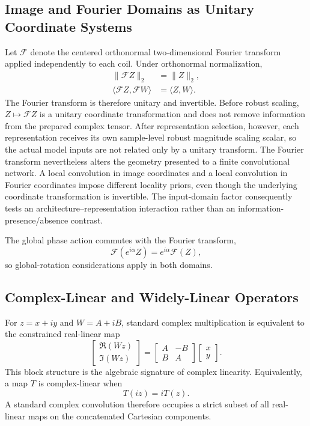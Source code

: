 \subsection{Image and Fourier Domains as Unitary Coordinate Systems}
Let $\mathcal{F}$ denote the centered orthonormal two-dimensional Fourier transform applied independently to each coil. Under orthonormal normalization,
\begin{align}
\|\mathcal{F}Z\|_2 &= \|Z\|_2,\\
\langle \mathcal{F}Z,\mathcal{F}W\rangle &= \langle Z,W\rangle.
\label{eq:parseval}
\end{align}
The Fourier transform is therefore unitary and invertible. Before robust scaling, $Z\mapsto\mathcal{F}Z$ is a unitary coordinate transformation and does not remove information from the prepared complex tensor. After representation selection, however, each representation receives its own sample-level robust magnitude scaling scalar, so the actual model inputs are not related only by a unitary transform. The Fourier transform nevertheless alters the geometry presented to a finite convolutional network. A local convolution in image coordinates and a local convolution in Fourier coordinates impose different locality priors, even though the underlying coordinate transformation is invertible. The input-domain factor consequently tests an architecture--representation interaction rather than an information-presence/absence contrast.

The global phase action commutes with the Fourier transform,
\begin{equation}
\mathcal{F}(e^{i\alpha}Z)=e^{i\alpha}\mathcal{F}(Z),
\end{equation}
so global-rotation considerations apply in both domains.

\subsection{Complex-Linear and Widely-Linear Operators}
For $z=x+iy$ and $W=A+iB$, standard complex multiplication is equivalent to the constrained real-linear map
\begin{equation}
\begin{bmatrix}\Re(Wz)\\\Im(Wz)\end{bmatrix}
=
\begin{bmatrix}A&-B\\B&A\end{bmatrix}
\begin{bmatrix}x\\y\end{bmatrix}.
\label{eq:real-linear-complex}
\end{equation}
This block structure is the algebraic signature of complex linearity. Equivalently, a map $T$ is complex-linear when
\begin{equation}
T(iz)=iT(z).
\label{eq:c-linear}
\end{equation}
A standard complex convolution therefore occupies a strict subset of all real-linear maps on the concatenated Cartesian components.

